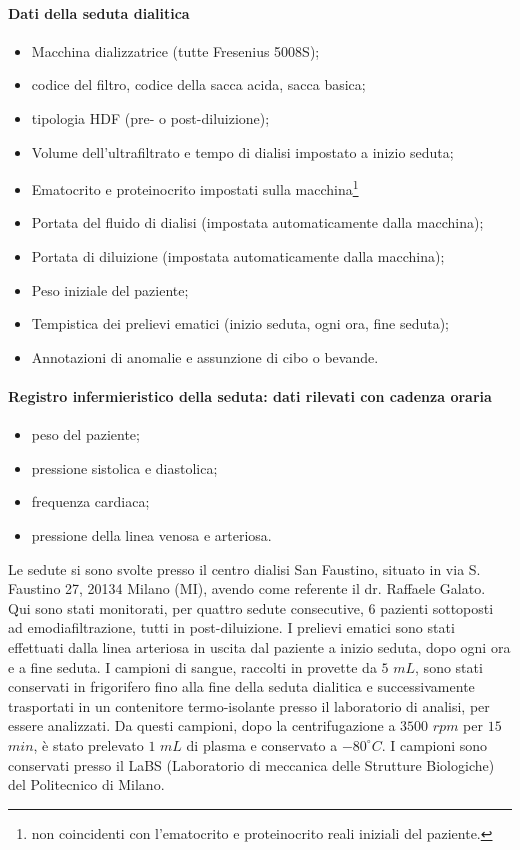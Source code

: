 \paragraph{Dati della seduta dialitica}
\begin{itemize}
	\item Macchina dializzatrice (tutte Fresenius 5008S);
	\item codice del filtro, codice della sacca acida, sacca basica;
	\item tipologia HDF (pre- o post-diluizione);
	\item Volume dell'ultrafiltrato e tempo di dialisi impostato a inizio seduta;
	\item Ematocrito e proteinocrito impostati sulla macchina\footnote{non coincidenti con l'ematocrito e proteinocrito reali iniziali del paziente.}
	\item Portata del fluido di dialisi (impostata automaticamente dalla macchina);
	\item Portata di diluizione (impostata automaticamente dalla macchina);
	\item Peso iniziale del paziente;
	\item Tempistica dei prelievi ematici (inizio seduta, ogni ora, fine seduta);
	\item Annotazioni di anomalie e assunzione di cibo o bevande.
\end{itemize}

\paragraph{Registro infermieristico della seduta: dati rilevati con cadenza oraria}
\begin{itemize}
	\item peso del paziente;
	\item pressione sistolica e diastolica;
	\item frequenza cardiaca;
	\item pressione della linea venosa e arteriosa.
\end{itemize}

\noindent
Le sedute si sono svolte presso il centro dialisi San Faustino, situato in via S. Faustino 27, 20134 Milano (MI), avendo come referente il dr. Raffaele Galato. Qui sono stati monitorati, per quattro sedute consecutive, 6 pazienti sottoposti ad emodiafiltrazione, tutti in post-diluizione. I prelievi ematici sono stati effettuati dalla linea arteriosa in uscita dal paziente a inizio seduta, dopo ogni ora e a fine seduta. I campioni di sangue, raccolti in provette da $5$ $mL$, sono stati conservati in frigorifero fino alla fine della seduta dialitica e successivamente trasportati in un contenitore termo-isolante presso il laboratorio di analisi, per essere analizzati. Da questi campioni, dopo la centrifugazione a $3500$ $rpm$ per $15$ $min$, è stato prelevato $1$ $mL$ di plasma e conservato a $-80^{\circ}C$. I campioni sono conservati presso il LaBS (Laboratorio di meccanica delle Strutture Biologiche) del Politecnico di Milano.


